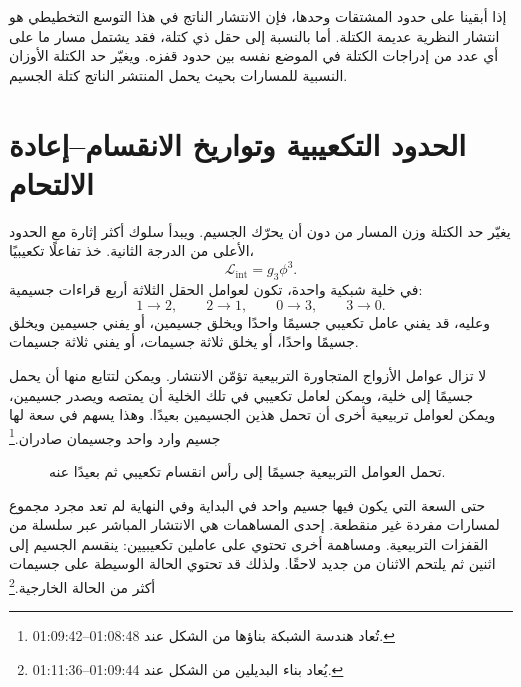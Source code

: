 إذا أبقينا على حدود المشتقات وحدها، فإن الانتشار الناتج في هذا التوسع التخطيطي هو انتشار النظرية عديمة الكتلة. أما بالنسبة إلى حقل ذي كتلة، فقد يشتمل مسار ما على أي عدد من إدراجات الكتلة في الموضع نفسه بين حدود قفزه. ويغيّر حد الكتلة الأوزان النسبية للمسارات بحيث يحمل المنتشر الناتج كتلة الجسيم.

\section{الحدود التكعيبية وتواريخ الانقسام--إعادة الالتحام}

يغيّر حد الكتلة وزن المسار من دون أن يحرّك الجسيم. ويبدأ سلوك أكثر إثارة مع الحدود الأعلى من الدرجة الثانية. خذ تفاعلًا تكعيبيًا،
\begin{equation}
\mathcal{L}_{\mathrm{int}}=g_3\phi^3.
\end{equation}
في خلية شبكية واحدة، تكون لعوامل الحقل الثلاثة أربع قراءات جسيمية:
\begin{equation}
1\longrightarrow 2,
\qquad
2\longrightarrow 1,
\qquad
0\longrightarrow 3,
\qquad
3\longrightarrow 0.
\end{equation}
وعليه، قد يفني عامل تكعيبي جسيمًا واحدًا ويخلق جسيمين، أو يفني جسيمين ويخلق جسيمًا واحدًا، أو يخلق ثلاثة جسيمات، أو يفني ثلاثة جسيمات.

لا تزال عوامل الأزواج المتجاورة التربيعية تؤمّن الانتشار. ويمكن لتتابع منها أن يحمل جسيمًا إلى خلية، ويمكن لعامل تكعيبي في تلك الخلية أن يمتصه ويصدر جسيمين، ويمكن لعوامل تربيعية أخرى أن تحمل هذين الجسيمين بعيدًا. وهذا يسهم في سعة لها جسيم وارد واحد وجسيمان صادران.\footnote{تُعاد هندسة الشبكة بناؤها من الشكل عند 01:08:48--01:09:42.}

\begin{figure}[htbp]
\centering
{}
\caption{تحمل العوامل التربيعية جسيمًا إلى رأس انقسام تكعيبي ثم بعيدًا عنه.}
\end{figure}

حتى السعة التي يكون فيها جسيم واحد في البداية وفي النهاية لم تعد مجرد مجموع لمسارات مفردة غير منقطعة. إحدى المساهمات هي الانتشار المباشر عبر سلسلة من القفزات التربيعية. ومساهمة أخرى تحتوي على عاملين تكعيبيين: ينقسم الجسيم إلى اثنين ثم يلتحم الاثنان من جديد لاحقًا. ولذلك قد تحتوي الحالة الوسيطة على جسيمات أكثر من الحالة الخارجية.\footnote{يُعاد بناء البديلين من الشكل عند 01:09:44--01:11:36.}


